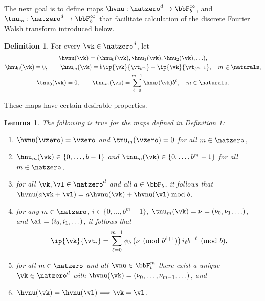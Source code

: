 \documentclass[]{elsarticle}
\newtheorem{lem}{Lemma}
\theoremstyle{definition}
\newtheorem{defin}{Definition}
\renewcommand{\bbK}{\natzero^d}
\begin{document}
The next goal is to define maps $\hvnu : \bbK \to \bbF_b^{\infty}$, and $\tnu_m : \bbK \to \bbF_b^{\infty}$ that facilitate calculation of the discrete Fourier Walsh transform introduced below.

\begin{defin} \label{numapdef} For every $\vk \in \bbK$, let
\begin{subequations} \label{numapdefeq}
\begin{gather}
\hvnu(\vk)=(\hnu_0(\vk), \hnu_1(\vk), \hnu_2(\vk), \ldots ), \\
\hnu_0(\vk) = 0, \qquad \hnu_m(\vk)=b\ip{\vk}{\vt_{b^m}}-\ip{\vk}{\vt_{b^{m-1}}}, \quad m \in \naturals, \\
\tnu_0(\vk) = 0, \qquad \tnu_m(\vk) = \sum_{\ell=0}^{m-1} \hnu_{\ell}(\vk) b^{\ell}, \quad m \in \naturals.
\end{gather}
\end{subequations}
\end{defin}

These maps have certain desirable properties.

\begin{lem} \label{numaplem} The following is true for the maps defined in Definition \ref{numapdef}:
\begin{enumerate}
\renewcommand{\labelenumi}{\alph{enumi})}

\item $\hvnu(\vzero)=\vzero$ and $\tnu_m(\vzero) = 0$ for all $m \in \natzero$,

\item $\hnu_m(\vk)\in \{0,\dots,b-1\}$ and $\tnu_m(\vk)\in \{0,\dots,b^m-1\}$ for all $m\in\natzero$.

\item for all $\vk, \vl \in \bbK$ and all $a \in \bbF_b$, it follows that $\hvnu(a\vk + \vl)=a\hvnu(\vk) + \hvnu(\vl) \bmod b$. %

\item for any $m \in \natzero$, $i \in \{0, \ldots, b^m-1\}$,  $\tnu_m(\vk)=\nu=(\nu_0, \nu_1, \ldots)$, and $\ai=(i_0, i_1, \ldots)$, it follows that
\begin{equation} \label{nuwisum}
\ip{\vk}{\vt_i} = \sum_{\ell=0}^{m-1} \phi_b\left(\nu \pmod {b^{\ell+1}}\right) i_{\ell}b^{-\ell} \pmod b,
\end{equation}

\item for all $m\in \natzero$ and all $\vnu \in \bbF_b^{m}$ there exist a unique $\vk \in \bbK$ with $\hvnu(\vk)=(\nu_0, \ldots, \nu_{m-1}, \ldots)$, and

\item $\hvnu(\vk)=\hvnu(\vl) \Longrightarrow \vk = \vl$.

\end{enumerate}
\end{lem}
\end{document}
